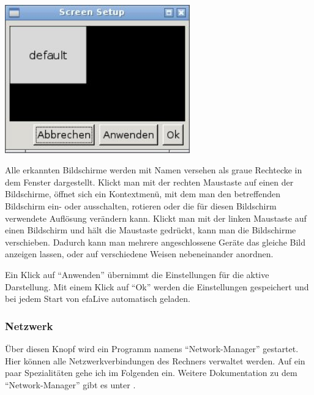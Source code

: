 \documentclass[a4paper,12pt,twoside]{article}
\begin{document}
\begin{minipage}{\linewidth}
    \centering
    \includegraphics[width=8cm]{screenshots/efaLivede-img22.jpg}
    \label{fig:bildschirm}
\end{minipage}
\bigskip

Alle erkannten Bildschirme werden mit Namen versehen als graue Rechtecke
in dem Fenster dargestellt. Klickt man mit der rechten Maustaste auf
einen der Bildschirme, öffnet sich ein Kontextmenü, mit dem man den
betreffenden Bildschirm ein- oder ausschalten, rotieren oder die für
diesen Bildschirm verwendete Auflösung verändern kann. Klickt man mit
der linken Maustaste auf einen Bildschirm und hält die Maustaste
gedrückt, kann man die Bildschirme verschieben. Dadurch kann man
mehrere angeschlossene Geräte das gleiche Bild anzeigen lassen, oder
auf verschiedene Weisen nebeneinander anordnen.

Ein Klick auf "`Anwenden"' übernimmt die
Einstellungen für die aktive Darstellung. Mit einem Klick auf
"`Ok"' werden die Einstellungen gespeichert
und bei jedem Start von efaLive automatisch geladen.


\subsubsection{Netzwerk}
\label{sct:dialog_netzwerk}
Über diesen Knopf wird ein Programm namens
"`Network-Manager"' gestartet. Hier können
alle Netzwerkverbindungen des Rechners verwaltet werden. Auf ein paar
Spezialitäten gehe ich im Folgenden ein. Weitere Dokumentation zu dem
"`Network-Manager"' gibt es unter \cite{NWM1}.
\end{document}
